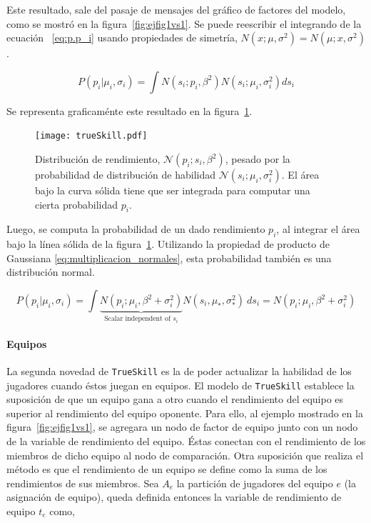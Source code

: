 \documentclass[11pt,twoside, spanish]{report} %
\newcommand{\N}{\mathcal{N}}
\begin{document}
Este resultado, sale del pasaje de mensajes del gr\'afico de factores del modelo, como se mostr\'o en la figura~\ref{fig:ejfig1vs1}. 
Se puede reescribir el integrando de la ecuaci\'on ~\ref{eq:p.p_i} usando propiedades de simetr\'ia, $ N (x; \mu, \sigma^2) = N (\mu; x, \sigma^2)$.

\begin{equation}
P(p_i|\mu_i,\sigma_i) = \int N(s_i; p_i, \beta^2)N(s_i;\mu_i,\sigma_i^2) ds_i
\end{equation}

Se representa graficam\'ente  este resultado en la figura~\ref{fig:fig8}.

\begin{figure}[H]
	\centering
	\texttt{[image: trueSkill.pdf]}
	\caption{Distribuci\'on de rendimiento, $\N(p_i;s_i,\beta^2)$, pesado por la probabilidad de distribuci\'on de habilidad $\N(s_i;\mu_i,\sigma_i^2)$. El \'area bajo la curva s\'olida tiene que ser integrada para computar una cierta probabilidad $p_i$.}
	\label{fig:fig8}
\end{figure}

Luego, se computa la probabilidad de un dado rendimiento $p_i$, al integrar el \'area bajo la l\'inea s\'olida de la figura~\ref{fig:fig8}.
Utilizando la propiedad de producto de Gaussiana \ref{eq:multiplicacion_normales}, esta probabilidad tambi\'en es una distribuci\'on normal.

\begin{equation}
P(p_i|\mu_i,\sigma_i) = \int \underbrace{N(p_i;\mu_i,\beta^2 + \sigma_i^2)}_{\text{Scalar independent of $s_i$}} N(s_i,\mu_{*},\sigma_{*}^2)  \ ds_i  = N(p_i;\mu_i,\beta^2 + \sigma_i^2)
\end{equation}

\paragraph{Equipos}

La segunda novedad de \texttt{TrueSkill} es la de poder actualizar la habilidad de los jugadores cuando \'estos juegan en equipos.
El modelo de \texttt{TrueSkill} establece la suposici\'on de que un equipo gana a otro cuando el rendimiento del equipo es superior al rendimiento del equipo oponente.
Para ello, al ejemplo mostrado en la figura~\ref{fig:ejfig1vs1}, se agregara un nodo de factor de equipo junto con un nodo de la variable de rendimiento del equipo.
\'Estas conectan con el rendimiento de los miembros de dicho equipo al nodo de comparaci\'on.
Otra suposici\'on que realiza el m\'etodo es que el rendimiento de un equipo se define como la suma de los rendimientos de sus miembros.
Sea $A_e$ la partici\'on de jugadores del equipo $e$ (la asignaci\'on de equipo), queda definida entonces la variable de rendimiento de equipo $t_e$ como,
\end{document}
